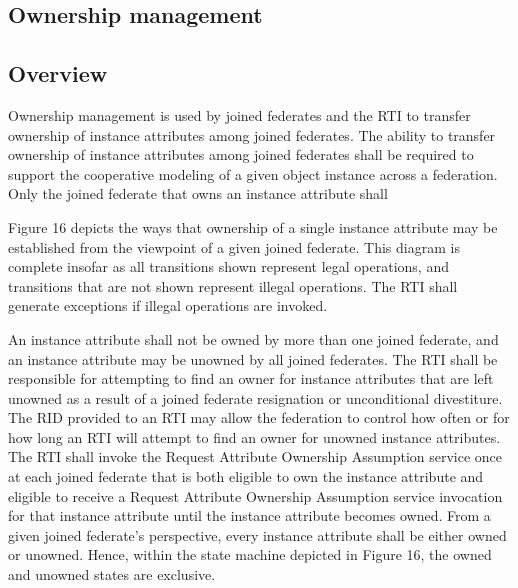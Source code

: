 
\clearpage

\begin{compactstdpage}

    \section{Ownership management}

    \subsection{Overview}


    Ownership management is used by joined federates and the RTI to transfer ownership of instance attributes among joined federates. The ability to transfer ownership of instance attributes among joined federates shall be required to support the cooperative modeling of a given object instance across a federation. Only the joined federate that owns an instance attribute shall




    Figure 16 depicts the ways that ownership of a single instance attribute may be established from the viewpoint of a given joined federate. This diagram is complete insofar as all transitions shown represent legal operations, and transitions that are not shown represent illegal operations. The RTI shall generate exceptions if illegal operations are invoked.


    An instance attribute shall not be owned by more than one joined federate, and an instance attribute may be unowned by all joined federates. The RTI shall be responsible for attempting to find an owner for instance attributes that are left unowned as a result of a joined federate resignation or unconditional divestiture. The RID provided to an RTI may allow the federation to control how often or for how long an RTI will attempt to find an owner for unowned instance attributes. The RTI shall invoke the Request Attribute Ownership Assumption \rtiinitiated{} service once at each joined federate that is both eligible to own the instance attribute and eligible to receive a Request Attribute Ownership Assumption \rtiinitiated{} service invocation for that instance attribute until the instance attribute becomes owned. From a given joined federate's perspective, every instance attribute shall be either owned or unowned. Hence, within the state machine depicted in Figure 16, the owned and unowned states are exclusive.



\end{compactstdpage}
